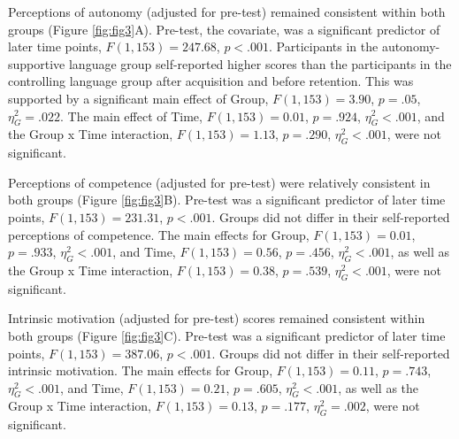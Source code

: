 \documentclass[doc,floatsintext,donotrepeattitle,letterpaper,12pt]{apa7}
\begin{document}
Perceptions of autonomy (adjusted for pre-test) remained consistent within both groups (Figure \ref{fig:fig3}A). Pre-test, the covariate, was a significant predictor of later time points, $F(1, 153) = 247.68$, $p < .001$. Participants in the autonomy-supportive language group self-reported higher scores than the participants in the controlling language group after acquisition and before retention. This was supported by a significant main effect of Group, $F(1, 153) = 3.90$, $p = .05$, $\eta_{G}^2 = .022$. The main effect of Time, $F(1, 153) = 0.01$, $p = .924$, $\eta_{G}^2 < .001$, and the Group x Time interaction, $F(1, 153) = 1.13$, $p = .290$, $\eta_{G}^2 < .001$, were not significant.

Perceptions of competence (adjusted for pre-test) were relatively consistent in both groups (Figure \ref{fig:fig3}B). Pre-test was a significant predictor of later time points, $F(1, 153) = 231.31$, $p < .001$. Groups did not differ in their self-reported perceptions of competence. The main effects for Group, $F(1, 153) = 0.01$, $p = .933$, $\eta_{G}^2 < .001$, and Time, $F(1, 153) = 0.56$, $p = .456$, $\eta_{G}^2 < .001$, as well as the Group x Time interaction, $F(1, 153) = 0.38$, $p = .539$, $\eta_{G}^2 < .001$, were not significant.

Intrinsic motivation (adjusted for pre-test) scores remained consistent within both groups (Figure \ref{fig:fig3}C). Pre-test was a significant predictor of later time points, $F(1, 153) = 387.06$, $p < .001$. Groups did not differ in their self-reported intrinsic motivation. The main effects for Group, $F(1, 153) = 0.11$, $p = .743$, $\eta_{G}^2 < .001$, and Time, $F(1, 153) = 0.21$, $p = .605$, $\eta_{G}^2 < .001$, as well as the Group x Time interaction, $F(1, 153) = 0.13$, $p = .177$, $\eta_{G}^2 = .002$, were not significant.

\clearpage
\end{document}
